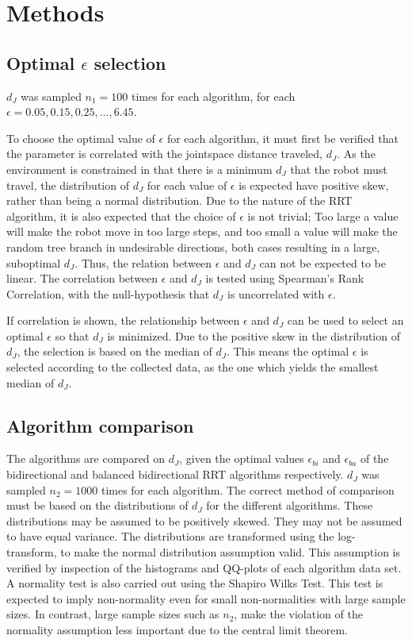 \section{Methods}
\subsection{Optimal \(\epsilon\) selection}
\(d_J\) was sampled \(n_1=100\) times for each algorithm, for each \(\epsilon=0.05,0.15,0.25,...,6.45\).

To choose the optimal value of \(\epsilon\) for each algorithm,
it must first be verified that the parameter is correlated
with the jointspace distance traveled, \(d_J\).
As the environment is constrained in that there is a minimum \(d_J\)
that the robot must travel, the distribution of \(d_J\) for each
value of \(\epsilon\) is expected have positive skew,
rather than being a normal distribution.
Due to the nature of the RRT algorithm, it is also expected that
the choice of \(\epsilon\) is not trivial;
Too large a value will make the robot move in too large steps,
and too small a value will make the random tree branch in
undesirable directions, both cases resulting in a large, suboptimal \(d_J\).
Thus, the relation between \(\epsilon\) and \(d_J\) can not be expected to be linear.
The correlation between \(\epsilon\) and \(d_J\) is tested using
Spearman's Rank Correlation, with the null-hypothesis that \(d_J\)
is uncorrelated with \(\epsilon\).

If correlation is shown, the relationship
between \(\epsilon\) and \(d_J\) can be used
to select an optimal \(\epsilon\) so that
\(d_J\) is minimized.
Due to the positive skew in the distribution
of \(d_J\), the selection is based on the median
of \(d_J\).
This means the optimal \(\epsilon\) is selected
according to the collected data,
as the one which yields the smallest median of \(d_J\).

\subsection{Algorithm comparison}
The algorithms are compared on \(d_J\),
given the optimal values \(\epsilon_{bi}\) and \(\epsilon_{ba}\)
of the bidirectional and balanced bidirectional RRT algorithms respectively.
\(d_J\) was sampled \(n_2=1000\) times for each algorithm.
The correct method of comparison must be based
on the distributions of \(d_J\) for the different algorithms.
These distributions may be assumed to be positively skewed.
They may not be assumed to have equal variance.
The distributions are transformed using the log-transform,
to make the normal distribution assumption valid.
This assumption is verified by inspection of the histograms
and QQ-plots of each algorithm data set.
A normality test is also carried out using the Shapiro Wilks Test.
This test is expected to imply non-normality even for small
non-normalities with large sample sizes. In contrast,
large sample sizes such as \(n_2\), make the violation of the normality assumption
less important due to the central limit theorem.


